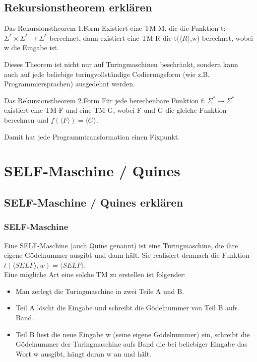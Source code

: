 \subsection{Rekursionstheorem erklären}
\begin{frame}
\begin{block}{Das Rekursionstheorem 1.Form}
Existiert eine TM M, die die Funktion t:$\Sigma^*\times \Sigma^*\rightarrow\Sigma^*$ berechnet, dann existiert eine TM R die t($\langle R\rangle$,w) berechnet, wobei w die Eingabe ist.
\end{block}
Dieses Theorem ist nicht nur auf Turingmaschinen beschränkt, sondern kann auch auf jede beliebige turingvollständige Codierungsform (wie z.B. Programmiersprachen) ausgedehnt werden.
\begin{block}{Das Rekursionstheorem 2.Form}
Für jede berechenbare Funktion f: $\Sigma^*\rightarrow\Sigma^*$ existiert eine TM F und eine TM G, wobei F und G die gleiche Funktion berechnen und $f(\langle F\rangle)=\langle G\rangle$.\\
\end{block}
Damit hat jede Programmtransformation einen Fixpunkt.
\end{frame}

\section{SELF-Maschine / Quines}
\subsection{SELF-Maschine / Quines erklären}
\begin{frame}
\frametitle{SELF-Maschine}
Eine SELF-Maschine (auch Quine genannt) ist eine Turingmaschine, die ihre eigene Gödelnummer ausgibt und dann hält. Sie realisiert demnach die Funktion $t(\langle SELF\rangle,w)=\langle SELF\rangle$.\\
Eine mögliche Art eine solche TM zu erstellen ist folgender:
\begin{itemize}
\item Man zerlegt die Turingmaschine in zwei Teile A und B. 
\item Teil A löscht die Eingabe und schreibt die Gödelnummer von Teil B aufs Band.
\item Teil B liest die neue Eingabe w (seine eigene Gödelnummer) ein, schreibt die Gödelnummer der Turingmaschine aufs Band die bei beliebiger Eingabe das Wort w ausgibt, hängt daran w an und hält.
\end{itemize}
\end{frame}

